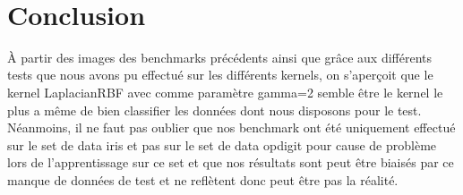 \documentclass[fontsize=10pt, twoside=no]{scrartcl} %
\begin{document}
\\

\part{Conclusion}

\`A partir des images des benchmarks précédents ainsi que grâce aux différents tests que nous avons pu effectué sur les différents kernels, on s'aperçoit que le kernel LaplacianRBF avec comme paramètre gamma=2 semble être le kernel le plus a même de bien classifier les données dont nous disposons pour le test. Néanmoins, il ne faut pas oublier que nos benchmark ont été uniquement effectué sur le set de data iris et pas sur le set de data opdigit pour cause de problème lors de l'apprentissage sur ce set et que nos résultats sont peut être biaisés par ce manque de données de test et ne reflètent donc peut être pas la réalité.
\end{document}
